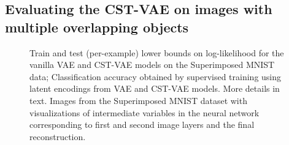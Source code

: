 \vspace{-2mm}
\subsection{Evaluating the CST-VAE on images with multiple overlapping
  objects}
\vspace{-2mm}

\begin{figure}[t]
\begin{center}
\;
\;
\vspace{-5mm}
\end{center}
 \caption{\footnotesize
  Train and test (per-example) lower bounds on log-likelihood 
for the vanilla VAE and CST-VAE models on the Superimposed MNIST data;
 Classification accuracy obtained by supervised training using latent encodings
 from VAE and CST-VAE models.
  More details in text.
   Images from the Superimposed MNIST dataset with visualizations of
 intermediate variables in the neural network corresponding to first and second image layers and the final reconstruction.
}\vspace{-3mm}
\end{figure}



